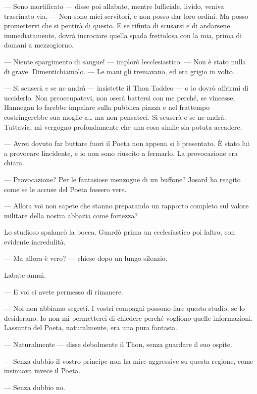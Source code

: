 --- Sono mortificato --- disse poi all\textquotesingle abate, mentre
l\textquotesingle ufficiale, livido, veniva trascinato via. --- Non sono
miei servitori, e non posso dar loro ordini. Ma posso promettervi che si
pentirà di questo. E se rifiuta di scusarsi e di andarsene
immediatamente, dovrà incrociare quella spada frettolosa con la mia,
prima di domani a mezzogiorno.

--- Niente spargimento di sangue! --- implorò
l\textquotesingle ecclesiastico. --- Non è stato nulla di grave.
Dimentichiamolo. --- Le mani gli tremavano, ed era grigio in volto.

--- Si scuserà e se ne andrà --- insistette il Thon Taddeo --- o io
dovrò offrirmi di ucciderlo. Non preoccupatevi, non oserà battersi con
me perché, se vincesse, Hannegan lo farebbe impalare sulla pubblica
piazza e nel frattempo costringerebbe sua moglie a\ldots{} ma non
pensateci. Si scuserà e se ne andrà. Tuttavia, mi vergogno profondamente
che una cosa simile sia potuta accadere.

--- Avrei dovuto far buttare fuori il Poeta non appena si è presentato.
È stato lui a provocare l\textquotesingle incidente, e io non sono
riuscito a fermarlo. La provocazione era chiara.

--- Provocazione? Per le fantasiose menzogne di un buffone? Josard ha
reagito come se le accuse del Poeta fossero vere.

--- Allora voi non sapete che stanno preparando un rapporto completo sul
valore militare della nostra abbazia come fortezza?

Lo studioso spalancò la bocca. Guardò prima un ecclesiastico poi
l\textquotesingle altro, con evidente incredulità.

--- Ma allora è vero? --- chiese dopo un lungo silenzio.

L\textquotesingle abate annuì.

--- E voi ci avete permesso di rimanere.

--- Noi non abbiamo segreti. I vostri compagni possono fare questo
studio, se lo desiderano. Io non mi permetterei di chiedere perché
vogliono quelle informazioni. L\textquotesingle assunto del Poeta,
naturalmente, era una pura fantasia.

--- Naturalmente --- disse debolmente il Thon, senza guardare il suo
ospite.

--- Senza dubbio il vostro principe non ha mire aggressive su questa
regione, come insinuava invece il Poeta.

--- Senza dubbio no.

